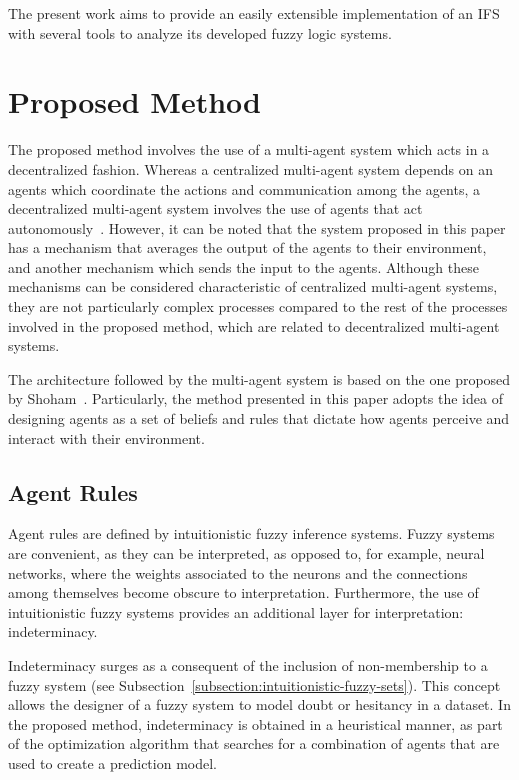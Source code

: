 \documentclass[review]{elsarticle}
\begin{document}
The present work aims to provide an easily extensible implementation of an IFS with several tools to analyze 
its developed fuzzy logic systems.

\section{Proposed Method}
\label{section:proposed-method}

The proposed method involves the use of a multi-agent system which acts in a
decentralized fashion. Whereas a centralized multi-agent system depends on an
agents which coordinate the actions and communication among the agents, a
decentralized multi-agent system involves the use of agents that act
autonomously~\cite{andreadis2014classification}. However, it can be noted that
the system proposed in this paper has a mechanism that averages the output of
the agents to their environment, and another mechanism which sends the input to
the agents. Although these mechanisms can be considered characteristic of
centralized multi-agent systems, they are not particularly complex processes
compared to the rest of the processes involved in the proposed method, which are
related to decentralized multi-agent systems.

The architecture followed by the multi-agent system is based on the one proposed
by Shoham~\cite{Shoham1993}. Particularly, the method presented in this paper
adopts the idea of designing agents as a set of beliefs and rules that dictate
how agents perceive and interact with their environment.

\subsection{Agent Rules}
\label{subsection:agent-rules}

Agent rules are defined by intuitionistic fuzzy inference systems. Fuzzy systems
are convenient, as they can be interpreted, as opposed to, for example, neural
networks, where the weights associated to the neurons and the connections among
themselves become obscure to interpretation. Furthermore, the use of
intuitionistic fuzzy systems provides an additional layer for interpretation:
indeterminacy.

Indeterminacy surges as a consequent of the inclusion of non-membership to a
fuzzy system (see Subsection~\ref{subsection:intuitionistic-fuzzy-sets}). This
concept allows the designer of a fuzzy system to model doubt or hesitancy in a
dataset. In the proposed method, indeterminacy is obtained in a heuristical
manner, as part of the optimization algorithm that searches for a combination of
agents that are used to create a prediction model.
\end{document}
